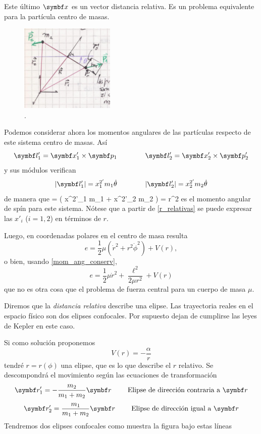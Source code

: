 \documentclass[10pt,oneside]{CBFT_book}
\begin{document}
Este último $\vb{x}$ es un vector distancia relativa. Es un problema equivalente para la partícula
centro de masas.

\begin{figure}[hbt]
	\begin{center}
	\includegraphics[width=0.4\textwidth]{images/fig_mc_prob_equiv.pdf}	 
	\end{center}
	\caption{.}
	\label{fig_mc_prob_equiv}
\end{figure} 

Podemos considerar ahora los momentos angulares de las partículas respecto de este sistema centro
de masas. Así
\[
	\vb{l}_1' = \vb{x}_1' \times \vb{p}_1 \qquad \qquad  \vb{l}_2' = \vb{x}_2' \times \vb{p}_2'
\]
y sus módulos verifican 
\[
	|\vb{l}_1'| = {x}^{2'}_1 m_1 \dot{\theta} \qquad \qquad  |\vb{l}_2'| = {x}^{2'}_2 m_2 \dot{\theta}
\]
de manera que 
\be
	\ell = ( {x}^{2'}_1 m_1 + {x}^{2'}_2 m_2 ) \dot{\theta} = \mu r^2 \dot{\theta}
	\label{mom_ang_conserv}
\ee
es el momento angular de spín para este sistema. Nótese que a partir de \eqref{r_relativas} se puede
expresar las $x'_i$ ($i=1,2$) en términos de $r$.

Luego, en coordenadas polares en el centro de masa resulta
\[
	e = \frac{1}{2} \mu ( \dot{ r}^2 + r^2\dot{\phi}^2 ) + V(r),
\]
o bien, usando \eqref{mom_ang_conserv},
\[
	e = \frac{1}{2} \mu \dot{ r}^2 + \frac{\ell^2}{2 \mu r^2 } + V(r)
\]
que no es otra cosa que el problema de fuerza central para un cuerpo de masa $\mu$.

Diremos que la {\it distancia relativa} describe una elipse. Las trayectoria reales en el espacio físico
son dos elipses confocales. Por supuesto dejan de cumplirse las leyes de Kepler en este caso.

Si como solución proponemos
\[
	V(r) = -\frac{\alpha}{r}
\]
tendré $ r = r(\phi) $ una elipse, que es lo que describe el $ r $ relativo.
Se descompondrá el movimiento según las ecuaciones de transformación
\[
	\vb{r}_1'= -\frac{m_2}{m_1+m_2} \vb{r} \qquad \text{ Elipse de dirección contraria a $\vb{r}$}
\]
\[
	\vb{r}_2'= \frac{m_1}{m_1+m_2} \vb{r} \qquad \text{ Elipse de dirección igual a $\vb{r}$}	
\]
Tendremos dos elipses confocales como muestra la figura bajo estas líneas 
\end{document}

